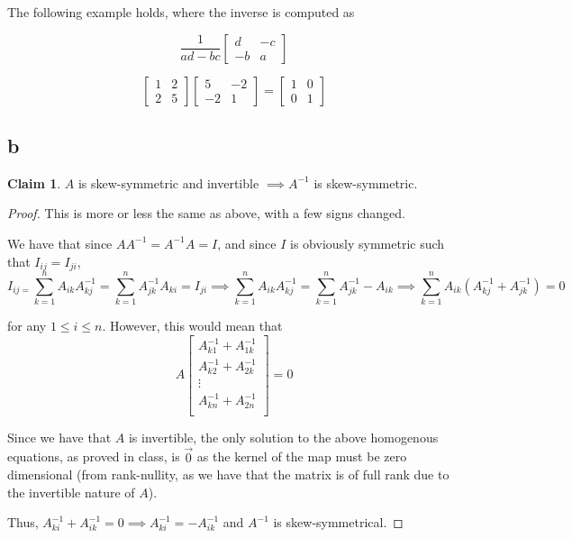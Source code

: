 \documentclass[12pt,letterpaper]{article}
\theoremstyle{definition}
\newtheorem*{claim}{Claim}
\begin{document}
The following example holds, where the inverse is computed as

\[
  \frac{1}{ad-bc}
  \begin{bmatrix}
    d & -c \\
    -b & a
  \end{bmatrix}
\]
 
\[
  \begin{bmatrix}
    1 & 2 \\
    2 & 5
  \end{bmatrix}
  \begin{bmatrix}
    5 & -2 \\
    -2 & 1
  \end{bmatrix}
  =
  \begin{bmatrix}
    1 & 0 \\
    0 & 1
  \end{bmatrix}
\]

\subsection*{b}

\begin{claim}
  $A$ is skew-symmetric and invertible $\implies A^{-1}$ is skew-symmetric. 
\end{claim}

\begin{proof}
  This is more or less the same as above, with a few signs changed.
  
  We have that since $AA^{-1} = A^{-1}A = I$, and since $I$ is obviously
  symmetric such that $I_{ij} = I_{ji}$,
  \[
    I_{ij = }\sum_{k=1}^nA_{ik}A^{-1}_{kj} = \sum_{k=1}^nA^{-1}_{jk}A_{ki} = I_{ji} \implies
    \sum_{k=1}^nA_{ik}A^{-1}_{kj} = \sum_{k=1}^nA^{-1}_{jk}-A_{ik} \implies
    \sum_{k=1}^nA_{ik}(A^{-1}_{kj} + A^{-1}_{jk}) = 0
  \]

  for any $1 \leq i \leq n$. However, this would mean that
  \[
    A\begin{bmatrix}
      A^{-1}_{k1} + A^{-1}_{1k} \\
      A^{-1}_{k2} + A^{-1}_{2k} \\
      \vdots \\
      A^{-1}_{kn} + A^{-1}_{2n} \\
    \end{bmatrix} = 0
  \]

  Since we have that $A$ is invertible, the only solution to the above homogenous equations,
  as proved in class, is $\vec{0}$ as the kernel of the map must be zero
  dimensional (from rank-nullity, as we have that the matrix is of full rank due
  to the invertible nature of $A$).

  Thus, $A^{-1}_{ki} + A^{-1}_{ik} = 0 \implies A^{-1}_{ki} = -A^{-1}_{ik}$ and
  $A^{-1}$ is skew-symmetrical.
\end{proof}
\end{document}
